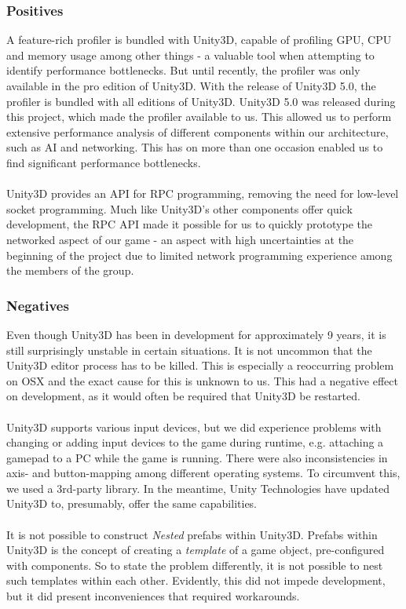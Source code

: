 \subsubsection*{Positives}
A feature-rich profiler is bundled with Unity3D, capable of profiling GPU, CPU
and memory usage among other things - a valuable tool when attempting to
identify performance bottlenecks. But until recently, the profiler was only
available in the pro edition of Unity3D. With the release of Unity3D 5.0, the
profiler is bundled with all editions of Unity3D. Unity3D 5.0 was released
during this project, which made the profiler available to us. This allowed us
to perform extensive performance analysis of different components within our
architecture, such as AI and networking. This has on more than one occasion
enabled us to find significant performance bottlenecks.
\\
\\
Unity3D provides an API for RPC programming, removing the need for low-level
socket programming. Much like Unity3D's other components offer quick
development, the RPC API made it possible for us to quickly prototype the
networked aspect of our game - an aspect with high uncertainties at the
beginning of the project due to limited network programming experience
among the members of the group.

\subsubsection*{Negatives}
Even though Unity3D has been in development for approximately 9 years, it is
still surprisingly unstable in certain situations\cite{unity-facts}. It is not uncommon that the
Unity3D editor process has to be killed. This is especially a
reoccurring problem on OSX and the exact cause for this is unknown to us. This
had a negative effect on development, as it would often be required that Unity3D
be restarted.
\\
\\
Unity3D supports various input devices, but we did experience problems with
changing or adding input devices to the game during runtime, e.g. attaching a
gamepad to a PC while the game is running. There were also inconsistencies in
axis- and button-mapping among different operating systems. To circumvent this,
we used a 3rd-party library. In the meantime, Unity Technologies have updated
Unity3D to, presumably, offer the same capabilities.
\\
\\
It is not possible to construct \textit{Nested} prefabs within Unity3D. Prefabs
within Unity3D is the concept of creating a \textit{template} of a game object,
pre-configured with components. So to state the problem differently, it is not
possible to nest such templates within each other. Evidently, this did not
impede development, but it did present inconveniences that required
workarounds.

